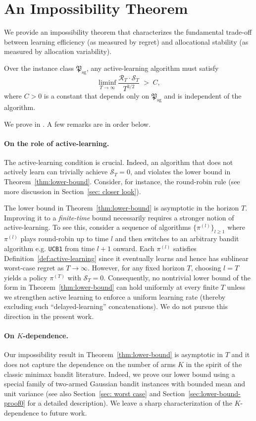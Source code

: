 \documentclass[nonblindrev]{informs3_noinforms}
\begin{document}
\section{{An Impossibility Theorem}}\label{sec:lower-bound}
{
We provide an impossibility theorem that characterizes the fundamental trade-off between learning efficiency (as measured by regret) and allocational stability (as measured by allocation variability).
\begin{theorem}\label{thm:lower-bound}
Over the instance class $\mathfrak{P}_{\mathrm{sg}}$, any active-learning algorithm must satisfy
\[
\liminf_{T\to\infty}\frac{\mathcal{R}_T\cdot\mathcal{S}_T}{T^{3/2}} \;>\; C,
\]
where $C>0$ is a constant that depends only on $\mathfrak{P}_{\mathrm{sg}}$ and is independent of the algorithm.
\end{theorem}
We prove  in . A few remarks are in order below.
\paragraph{On the role of active-learning.} The active-learning condition is crucial. Indeed, an algorithm that does not actively learn can trivially achieve $\mathcal{S}_T=0$, and violates the lower bound in  Theorem~\ref{thm:lower-bound}. Consider, for instance, the round-robin rule (see more discussion in Section~\ref{sec: closer look}). 

The lower bound in Theorem~\ref{thm:lower-bound} is asymptotic in the horizon $T$. Improving it to a \textit{finite-time} bound necessarily requires a stronger notion of active-learning. To see this, consider a sequence of algorithms $\{\pi^{(l)}\}_{l\ge 1}$ where $\pi^{(l)}$ plays round-robin up to time $l$ and then switches to an arbitrary bandit algorithm e.g. \texttt{UCB1} from time $l+1$ onward. Each $\pi^{(l)}$ satisfies Definition~\ref{def:active-learning} since it eventually learns and hence has sublinear worst-case regret as $T\to\infty$. However, for any fixed horizon $T$, choosing $l=T$ yields a policy $\pi^{(T)}$ with $\mathcal{S}_T=0$. Consequently, no nontrivial lower bound of the form in Theorem~\ref{thm:lower-bound} can hold uniformly at every finite $T$ unless we strengthen active learning to enforce a uniform learning rate (thereby excluding such ``delayed-learning'' concatenations). We do not pursue this direction in the present work. 

\paragraph{On $K$-dependence.} 
Our impossibility result in Theorem~\ref{thm:lower-bound} is asymptotic in $T$ and it does not capture the dependence on the number of arms $K$ in the spirit of the classic minimax bandit literature. Indeed, we prove our lower bound using a special family of two-armed Gaussian bandit instances with bounded mean and unit variance (see also Section~\ref{sec: worst case} and Section~\ref{sec:lower-bound-proof0} for a detailed description). We leave a sharp characterization of the $K$-dependence to future work.

}
\end{document}
